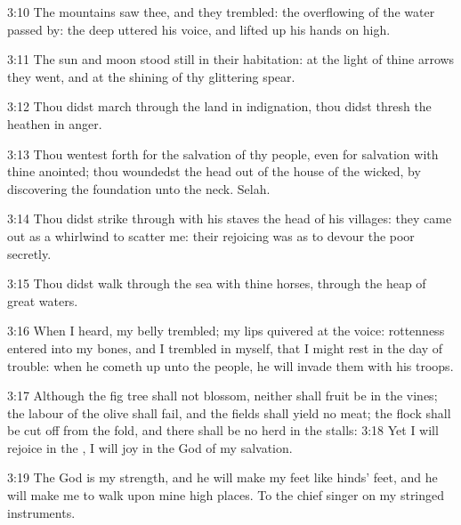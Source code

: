 3:10 The mountains saw thee, and they trembled: the overflowing of the water passed by: the deep uttered his voice, and lifted up his hands on high.

3:11 The sun and moon stood still in their habitation: at the light of thine arrows they went, and at the shining of thy glittering spear.

3:12 Thou didst march through the land in indignation, thou didst thresh the heathen in anger.

3:13 Thou wentest forth for the salvation of thy people, even for salvation with thine anointed; thou woundedst the head out of the house of the wicked, by discovering the foundation unto the neck.  Selah.

3:14 Thou didst strike through with his staves the head of his villages: they came out as a whirlwind to scatter me: their rejoicing was as to devour the poor secretly.

3:15 Thou didst walk through the sea with thine horses, through the heap of great waters.

3:16 When I heard, my belly trembled; my lips quivered at the voice: rottenness entered into my bones, and I trembled in myself, that I might rest in the day of trouble: when he cometh up unto the people, he will invade them with his troops.

3:17 Although the fig tree shall not blossom, neither shall fruit be in the vines; the labour of the olive shall fail, and the fields shall yield no meat; the flock shall be cut off from the fold, and there shall be no herd in the stalls: 3:18 Yet I will rejoice in the \LORD, I will joy in the God of my salvation.

3:19 The \LORD God is my strength, and he will make my feet like hinds' feet, and he will make me to walk upon mine high places. To the chief singer on my stringed instruments.

